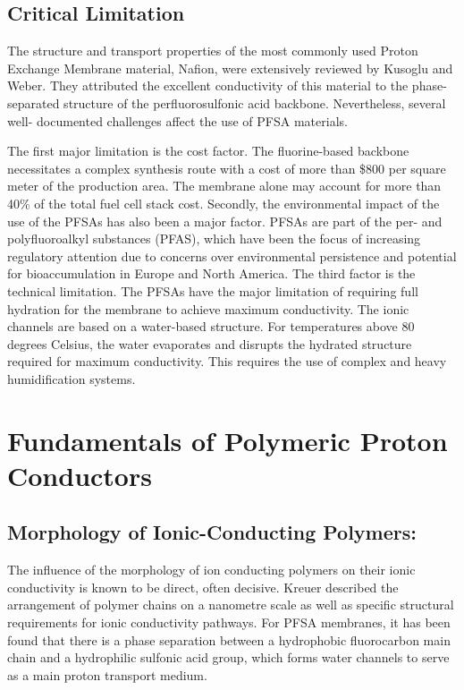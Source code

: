 \documentclass[12pt,a4paper]{report}
\begin{document}
\subsection{Critical Limitation}
The structure and transport properties of the most commonly used Proton Exchange Membrane material, Nafion, were extensively reviewed by Kusoglu and Weber. They attributed the excellent conductivity of this material to the phase-separated structure of the perfluorosulfonic acid backbone.\cite{24} Nevertheless, several well- documented challenges affect the use of PFSA materials.

The first major limitation is the cost factor. The fluorine-based backbone necessitates a complex synthesis route with a cost of more than \$800 per square meter of the production area. The membrane alone may account for more than 40\% of the total fuel cell stack cost.\cite{1,4} Secondly, the environmental impact of the use of the PFSAs has also been a major factor. PFSAs are part of the per- and polyfluoroalkyl substances (PFAS), which have been the focus of increasing regulatory attention due to concerns over environmental persistence and potential for bioaccumulation in Europe and North America.\cite{24} The third factor is the technical limitation. The PFSAs have the major limitation of requiring full hydration for the membrane to achieve maximum conductivity. The ionic channels are based on a water-based structure.\cite{5} For temperatures above 80 degrees Celsius, the water evaporates and disrupts the hydrated structure required for maximum conductivity. This requires the use of complex and heavy humidification systems.\cite{3,4}

\section{Fundamentals of Polymeric Proton Conductors}
\subsection{Morphology of Ionic-Conducting Polymers:}
The influence of the morphology of ion conducting polymers on their ionic conductivity is known to be direct, often decisive. Kreuer described the arrangement of polymer chains on a nanometre scale as well as specific structural requirements for ionic conductivity pathways.\cite{7} For PFSA membranes, it has been found that there is a phase separation between a hydrophobic fluorocarbon main chain and a hydrophilic sulfonic acid group, which forms water channels to serve as a main proton transport medium.
\end{document}
